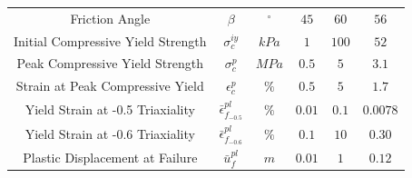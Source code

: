 \begin{table}[!htb]
\begin{tabulary}{\textwidth}{@{}cCcCCC@{}}
Friction Angle                     & $\beta$                          & $^{\circ}$     & $45$                                                            & $60$                                                            & $56$                                                              \\
Initial Compressive Yield Strength & $\sigma_c^{iy}$                  & $kPa$          & $1$                                                             & $100$                                                           & $52$                                                              \\
Peak Compressive Yield Strength    & $\sigma_c^{p}$                   & $MPa$          & $0.5$                                                           & $5$                                                             & $3.1$                                                             \\
Strain at Peak Compressive Yield   & $\epsilon_c^{p}$                 & $\%$           & $0.5$                                                           & $5$                                                             & $1.7$                                                             \\
Yield Strain at -0.5 Triaxiality   & $\bar{\epsilon}^{pl}_{f_{-0.5}}$ & $\%$           & $0.01$                                                          & $0.1$                                                           & $0.0078$                                                          \\
Yield Strain at -0.6 Triaxiality   & $\bar{\epsilon}^{pl}_{f_{-0.6}}$ & $\%$           & $0.1$                                                           & $10$                                                            & $0.30$                                                            \\
Plastic Displacement at Failure    & $\bar{u}^{pl}_f$                 & $m$            & $0.01$                                                          & $1$                                                             & $0.12$                                                            \\ \bottomrule
\end{tabulary}
\end{table}

